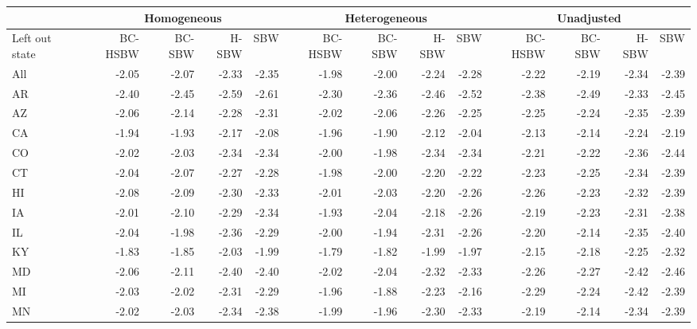 \begin{landscape}
\captionsetup[table]{labelformat=empty,skip=1pt}
\begin{table}[H]\caption{Leave one state out jackknife point estimates: all estimators, primary dataset}\label{tab:loojackknifec1}
\centering
\begin{longtable}{lrrrr|rrrr|rrrr}
\hline
 & \multicolumn{4}{c}{Homogeneous} & \multicolumn{4}{c}{Heterogeneous} & \multicolumn{4}{c}{Unadjusted} \\ 
 \hline
Left out state & BC-HSBW & BC-SBW & H-SBW & SBW & BC-HSBW & BC-SBW & H-SBW & SBW & BC-HSBW & BC-SBW & H-SBW & SBW \\ 
\hline
All & -2.05 & -2.07 & -2.33 & -2.35 & -1.98 & -2.00 & -2.24 & -2.28 & -2.22 & -2.19 & -2.34 & -2.39 \\ 
AR & -2.40 & -2.45 & -2.59 & -2.61 & -2.30 & -2.36 & -2.46 & -2.52 & -2.38 & -2.49 & -2.33 & -2.45 \\ 
AZ & -2.06 & -2.14 & -2.28 & -2.31 & -2.02 & -2.06 & -2.26 & -2.25 & -2.25 & -2.24 & -2.35 & -2.39 \\ 
CA & -1.94 & -1.93 & -2.17 & -2.08 & -1.96 & -1.90 & -2.12 & -2.04 & -2.13 & -2.14 & -2.24 & -2.19 \\ 
CO & -2.02 & -2.03 & -2.34 & -2.34 & -2.00 & -1.98 & -2.34 & -2.34 & -2.21 & -2.22 & -2.36 & -2.44 \\ 
CT & -2.04 & -2.07 & -2.27 & -2.28 & -1.98 & -2.00 & -2.20 & -2.22 & -2.23 & -2.25 & -2.34 & -2.39 \\ 
HI & -2.08 & -2.09 & -2.30 & -2.33 & -2.01 & -2.03 & -2.20 & -2.26 & -2.26 & -2.23 & -2.32 & -2.39 \\ 
IA & -2.01 & -2.10 & -2.29 & -2.34 & -1.93 & -2.04 & -2.18 & -2.26 & -2.19 & -2.23 & -2.31 & -2.38 \\ 
IL & -2.04 & -1.98 & -2.36 & -2.29 & -2.00 & -1.94 & -2.31 & -2.26 & -2.20 & -2.14 & -2.35 & -2.40 \\ 
KY & -1.83 & -1.85 & -2.03 & -1.99 & -1.79 & -1.82 & -1.99 & -1.97 & -2.15 & -2.18 & -2.25 & -2.32 \\ 
MD & -2.06 & -2.11 & -2.40 & -2.40 & -2.02 & -2.04 & -2.32 & -2.33 & -2.26 & -2.27 & -2.42 & -2.46 \\ 
MI & -2.03 & -2.02 & -2.31 & -2.29 & -1.96 & -1.88 & -2.23 & -2.16 & -2.29 & -2.24 & -2.42 & -2.39 \\ 
MN & -2.02 & -2.03 & -2.34 & -2.38 & -1.99 & -1.96 & -2.30 & -2.33 & -2.19 & -2.14 & -2.34 & -2.39 \\ 

\end{longtable}
\end{table}
\end{landscape}
